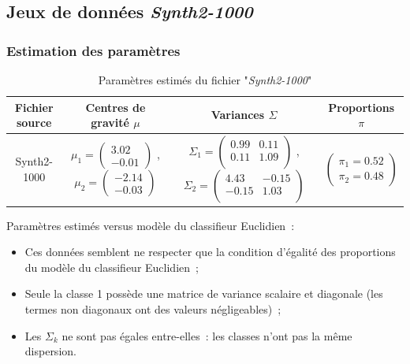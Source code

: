 \documentclass[a4paper,10pt]{report}
\begin{document}
\subsection{Jeux de données \textit{Synth2-1000}}

\subsubsection{Estimation des paramètres}


\begin{table}[H]
	\centering
	\begin{tabular}{c|c|c|c}
		Fichier source & Centres de gravité $\mu$ & Variances $\Sigma$ & Proportions $\pi$ \\ 
		\hline
		\small Synth2-1000 
		& 	$\mu_{1} = 
		\begin{pmatrix}
		3.02 \\ 
		-0.01
		\end{pmatrix} $ , 
		$\mu_{2} = 
		\begin{pmatrix}
		-2.14 \\ 
		-0.03
		\end{pmatrix} $ 
		&  	$\Sigma_{1} = 
		\begin{pmatrix}
		0.99 & 0.11 \\
		0.11 & 1.09\\
		\end{pmatrix} $ , 
		$\Sigma_{2} = 
		\begin{pmatrix}
		4.43 & -0.15\\
		-0.15 & 1.03 \\
		\end{pmatrix} $
		& 	$\begin{pmatrix} 
		\pi_{1} = 0.52\\
		\pi_{2} = 0.48
		\end{pmatrix}$\\ 
	\end{tabular}
	\caption{\small Paramètres estimés du fichier "\textit{Synth2-1000}"}
	\label{table:1-2-parametres-Synth2}
\end{table}



Paramètres estimés versus modèle du classifieur Euclidien~:
\begin{itemize}
	\item Ces données semblent ne respecter que la condition d'égalité des proportions du modèle du classifieur Euclidien~;
	\item Seule la classe 1 possède une matrice de variance scalaire et diagonale (les termes non diagonaux ont des valeurs négligeables)~;
	\item Les $\Sigma_k$ ne sont pas égales entre-elles~: les classes n'ont pas la même dispersion.
\end{itemize}
\end{document}
